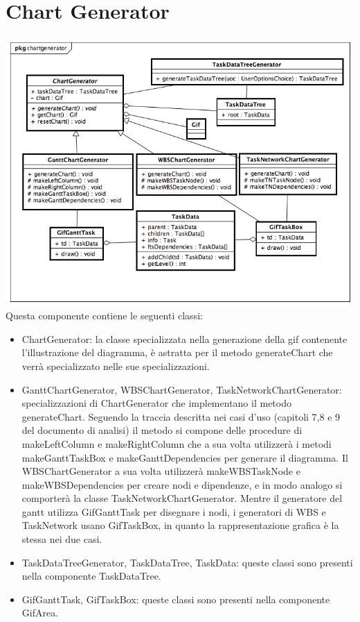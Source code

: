 \documentclass[a4paper, 12pt]{report}
\begin{document}
\section{Chart Generator}
\includegraphics[width=\textwidth]{chart/ChartGenerator.png}
Questa componente contiene le seguenti classi:
\begin{itemize}
	\item ChartGenerator: la classe specializzata nella generazione della gif contenente l'illustrazione del diagramma, \`e astratta per il metodo generateChart che verr\`a specializzato nelle sue specializzazioni.
	\item GanttChartGenerator, WBSChartGenerator, TaskNetworkChartGenerator: specializzazioni di ChartGenerator che implementano il metodo generateChart. Seguendo la traccia descritta nei casi d'uso (capitoli 7,8 e 9 del documento di analisi) il metodo si compone delle procedure di makeLeftColumn e makeRightColumn che a sua volta utilizzer\`a i metodi makeGanttTaskBox e makeGanttDependencies per generare il diagramma. Il WBSChartGenerator a sua volta utilizzer\`a makeWBSTaskNode e makeWBSDependencies per creare nodi e dipendenze, e in modo analogo si comporter\`a la classe TaskNetworkChartGenerator. Mentre il generatore del gantt utilizza GifGanttTask per disegnare i nodi, i generatori di WBS e TaskNetwork usano GifTaskBox, in quanto la rappresentazione grafica \`e la stessa nei due casi.
	\item TaskDataTreeGenerator, TaskDataTree, TaskData: queste classi sono presenti nella componente TaskDataTree.
	\item GifGanttTask, GifTaskBox: queste classi sono presenti nella componente GifArea.
\end{itemize}
\end{document}
